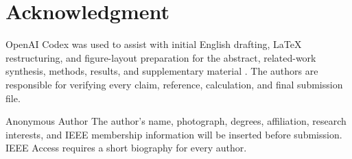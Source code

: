 \documentclass{ieeeaccess}
\begin{document}
\section*{Acknowledgment}
OpenAI Codex was used to assist with initial English drafting, LaTeX restructuring, and figure-layout preparation for the abstract, related-work synthesis, methods, results, and supplementary material \cite{openai2026codex}. The authors are responsible for verifying every claim, reference, calculation, and final submission file.




\begin{IEEEbiographynophoto}{Anonymous Author}
The author's name, photograph, degrees, affiliation, research interests, and IEEE membership information will be inserted before submission. IEEE Access requires a short biography for every author.
\end{IEEEbiographynophoto}

\EOD
\end{document}
